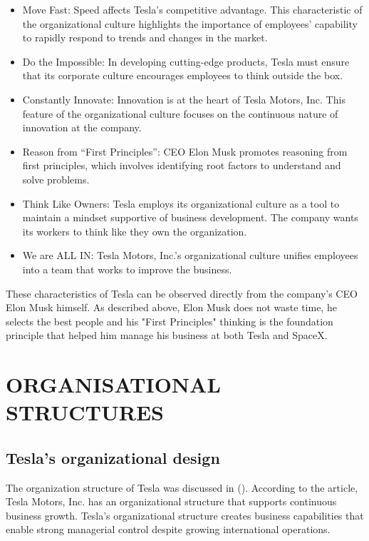 \documentclass[12pt]{article}
\begin{document}
\begin{itemize}
	\item{Move Fast: Speed affects Tesla’s competitive advantage. This characteristic of the organizational culture highlights the importance of employees’ capability to rapidly respond to trends and changes in the market.}

	\item{Do the Impossible: In developing cutting-edge products, Tesla must ensure that its corporate culture encourages employees to think outside the box.}

	\item{Constantly Innovate: Innovation is at the heart of Tesla Motors, Inc. This feature of the organizational culture focuses on the continuous nature of innovation at the company.}

	\item{Reason from “First Principles”: CEO Elon Musk promotes reasoning from first principles, which involves identifying root factors to understand and solve problems.}

	\item{Think Like Owners: Tesla employs its organizational culture as a tool to maintain a mindset supportive of business development. The company wants its workers to think like they own the organization.}

	\item{We are ALL IN: Tesla Motors, Inc.’s organizational culture unifies employees into a team that works to improve the business.}
\end{itemize}

These characteristics of Tesla can be observed directly from the company's CEO Elon Musk himself. As described above, Elon Musk does not waste time, he selects the best people and his "First Principles" thinking is the foundation principle that helped him manage his business at both Tesla and SpaceX.

\section{ORGANISATIONAL STRUCTURES}

\subsection{Tesla's organizational design}

The organization structure of Tesla was discussed in (\cite{me17b}). According to the article, Tesla Motors, Inc. has an organizational structure that supports continuous business growth. Tesla’s organizational structure creates business capabilities that enable strong managerial control despite growing international operations.
\end{document}
